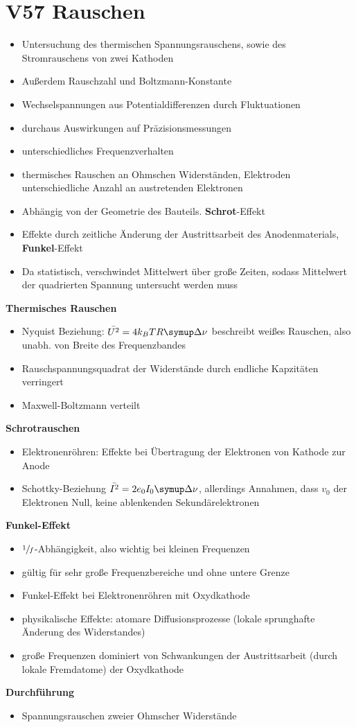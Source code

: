 \section{V57 Rauschen}
\label{sec:V57}

\begin{itemize}
    \item Untersuchung des thermischen Spannungsrauschens, sowie des Stromrauschens von zwei Kathoden
    \item Außerdem Rauschzahl und Boltzmann-Konstante
    \item Wechselspannungen aus Potentialdifferenzen durch Fluktuationen
    \item durchaus Auswirkungen auf Präzisionsmessungen
    \item unterschiedliches Frequenzverhalten
    \item thermisches Rauschen an Ohmschen Widerständen, Elektroden unterschiedliche Anzahl an austretenden Elektronen
    \item Abhängig von der Geometrie des Bauteils. \textbf{Schrot}-Effekt
    \item Effekte durch zeitliche Änderung der Austrittsarbeit des Anodenmaterials, \textbf{Funkel}-Effekt
    \item Da statistisch, verschwindet Mittelwert über große Zeiten, sodass Mittelwert der quadrierten Spannung untersucht werden muss
\end{itemize}

\textbf{Thermisches Rauschen}
\begin{itemize}
    \item Nyquist Beziehung: $\bar{U^2} = 4k_BTR\upD\nu$ beschreibt weißes Rauschen, also unabh. von Breite des Frequenzbandes
    \item Rauschspannungsquadrat der Widerstände durch endliche Kapzitäten verringert
    \item Maxwell-Boltzmann verteilt
\end{itemize}

\textbf{Schrotrauschen}
\begin{itemize}
    \item Elektronenröhren: Effekte bei Übertragung der Elektronen von Kathode zur Anode
    \item Schottky-Beziehung $\bar{I^2} = 2e_0I_0\upD\nu$, allerdings Annahmen, dass $v_0$ der Elektronen Null, keine ablenkenden Sekundärelektronen
\end{itemize}

\textbf{Funkel-Effekt}
\begin{itemize}
    \item $\sfrac{1}{f}$-Abhängigkeit, also wichtig bei kleinen Frequenzen
    \item gültig für sehr große Frequenzbereiche und ohne untere Grenze
    \item Funkel-Effekt bei Elektronenröhren mit Oxydkathode
    \item physikalische Effekte: atomare Diffusionsprozesse (lokale sprunghafte Änderung des Widerstandes)
    \item große Frequenzen dominiert von Schwankungen der Austrittsarbeit (durch lokale Fremdatome) der Oxydkathode
\end{itemize}

\textbf{Durchführung}
\begin{itemize}
    \item Spannungsrauschen zweier Ohmscher Widerstände
\end{itemize}
